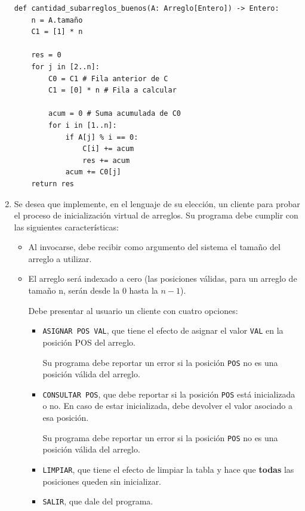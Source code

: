 \documentclass[letterpaper, 12pt]{article}
\begin{document}
\begin{enumerate}
\begin{verbatim}
def cantidad_subarreglos_buenos(A: Arreglo[Entero]) -> Entero:
    n = A.tamaño
    C1 = [1] * n

    res = 0
    for j in [2..n]:
        C0 = C1 # Fila anterior de C
        C1 = [0] * n # Fila a calcular

        acum = 0 # Suma acumulada de C0
        for i in [1..n]:
            if A[j] % i == 0:
                C[i] += acum
                res += acum
            acum += C0[j]
    return res
\end{verbatim}

\pagebreak

\item Se desea que implemente, en el lenguaje de su elección, un cliente para probar el proceso de inicialización virtual de arreglos. Su programa debe cumplir con las siguientes características:

\begin{itemize}
    \item  Al invocarse, debe recibir como argumento del sistema el tamaño del arreglo a utilizar.
    \item El arreglo será indexado a cero (las posiciones válidas, para un arreglo de tamaño n, serán desde la $0$ hasta la $n - 1$).

    Debe presentar al usuario un cliente con cuatro opciones:
    \begin{itemize}
        \item \texttt{ASIGNAR POS VAL}, que tiene el efecto de asignar el valor \texttt{VAL} en la posición {POS} del arreglo.

        Su programa debe reportar un error si la posición \texttt{POS} no es una posición válida del arreglo.

        \item \texttt{CONSULTAR POS}, que debe reportar si la posición \texttt{POS} está inicializada o no. En caso de estar inicializada, debe devolver el valor asociado a esa posición.

        Su programa debe reportar un error si la posición \texttt{POS} no es una posición válida del arreglo.

        \item \texttt{LIMPIAR}, que tiene el efecto de limpiar la tabla y hace que \textbf{todas} las posiciones queden sin inicializar.

        \item \texttt{SALIR}, que dale del programa.
    \end{itemize}


\end{itemize}
\end{enumerate}
\end{document}
